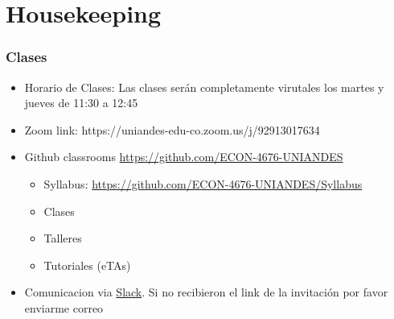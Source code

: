 \documentclass[
  shownotes,
  xcolor={svgnames},
  hyperref={colorlinks,citecolor=DarkBlue,linkcolor=DarkRed,urlcolor=DarkBlue}
  ]{beamer}
\begin{document}
\section{Housekeeping}
\begin{frame}
\frametitle{Clases}


    \begin{itemize}
      \item Horario de Clases: Las clases serán completamente virutales los martes y jueves de 11:30 a 12:45
      \bigskip
      \item Zoom link: https://uniandes-edu-co.zoom.us/j/92913017634
      \bigskip
      \item Github classrooms \url{https://github.com/ECON-4676-UNIANDES}
      \begin{itemize}
        \item Syllabus: \url{https://github.com/ECON-4676-UNIANDES/Syllabus}
        \item Clases
        \item Talleres
        \item Tutoriales (eTAs)
        \end{itemize}
      \bigskip
      \item Comunicacion via \href{https://slack.com/}{Slack}. Si no recibieron el link de la invitación por favor enviarme correo
    \end{itemize}


\end{frame}

\end{document}
